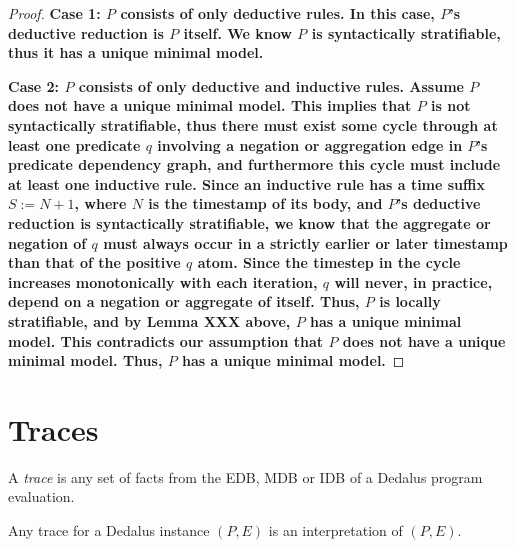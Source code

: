 \begin{proof}
%
\bf{Case 1:} $P$ consists of only deductive rules.  In this case, $P$'s
deductive reduction is $P$ itself.  We know $P$ is syntactically stratifiable,
thus it has a unique minimal model.

\bf{Case 2:} $P$ consists of only deductive and inductive rules.  Assume $P$
does not have a unique minimal model.  This implies that $P$ is not
syntactically stratifiable, thus there must exist some cycle through at least
one predicate $q$ involving a negation or aggregation edge in $P$'s predicate
dependency graph, and furthermore this cycle must include at least one
inductive rule.  Since an inductive rule has a time suffix $S := N+1$, where
$N$ is the timestamp of its body, and $P$'s deductive reduction is
syntactically stratifiable, we know that the aggregate or negation of $q$ must
always occur in a strictly earlier or later timestamp than that of the positive
$q$ atom.  Since the timestep in the cycle increases monotonically with each
iteration, $q$ will never, in practice, depend on a negation or aggregate of
itself.  Thus, $P$ is locally stratifiable, and by Lemma XXX above, $P$ has a
unique minimal model.  This contradicts our assumption that $P$ does not have a
unique minimal model.  Thus, $P$ has a unique minimal model.
%
\end{proof}


\section{Traces}



\begin{definition}
A \emph{trace} is any set of facts from the EDB, MDB or IDB of a Dedalus program evaluation.
\end{definition}

Any trace for a Dedalus instance $(P,E)$ is an interpretation of $(P,E)$.

